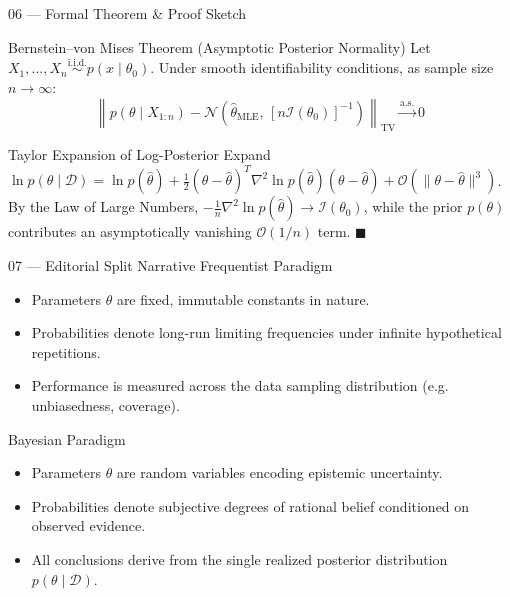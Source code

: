 \documentclass[aspectratio=169,10pt]{beamer}
\begin{document}
\begin{frame}{06 — Formal Theorem \& Proof Sketch}
  \begin{TheoremBox}{Bernstein--von Mises Theorem (Asymptotic Posterior Normality)}
    Let $X_1, \dots, X_n \overset{\text{i.i.d.}}{\sim} p(x \mid \theta_0)$. Under smooth identifiability conditions, as sample size $n \to \infty$:
    \[
      \left\| p(\theta \mid X_{1:n}) - \mathcal{N}\left(\hat{\theta}_{\mathrm{MLE}}, \, [n\mathcal{I}(\theta_0)]^{-1}\right) \right\|_{\mathrm{TV}} \xrightarrow{\mathrm{a.s.}} 0
    \]
  \end{TheoremBox}
  \vspace{.10cm}
  \begin{ProofSketch}{Taylor Expansion of Log-Posterior}
    Expand $\ln p(\theta \mid \mathcal{D}) = \ln p(\hat{\theta}) + \frac{1}{2}(\theta - \hat{\theta})^T \nabla^2 \ln p(\hat{\theta}) (\theta - \hat{\theta}) + \mathcal{O}(\|\theta - \hat{\theta}\|^3)$. By the Law of Large Numbers, $-\frac{1}{n}\nabla^2 \ln p(\hat{\theta}) \to \mathcal{I}(\theta_0)$, while the prior $p(\theta)$ contributes an asymptotically vanishing $\mathcal{O}(1/n)$ term. \hfill$\blacksquare$
  \end{ProofSketch}
\end{frame}

\begin{frame}{07 — Editorial Split Narrative}
  \SplitEditorial%
    {Frequentist Paradigm}{%
      \begin{itemize}\setlength{\itemsep}{.25em}
        \item Parameters $\theta$ are fixed, immutable constants in nature.
        \item Probabilities denote long-run limiting frequencies under infinite hypothetical repetitions.
        \item Performance is measured across the data sampling distribution (e.g. unbiasedness, coverage).
      \end{itemize}
    }%
    {Bayesian Paradigm}{%
      \begin{itemize}\setlength{\itemsep}{.25em}
        \item Parameters $\theta$ are random variables encoding epistemic uncertainty.
        \item Probabilities denote subjective degrees of rational belief conditioned on observed evidence.
        \item All conclusions derive from the single realized posterior distribution $p(\theta \mid \mathcal{D})$.
      \end{itemize}
    }
  \vfill
\end{frame}
\end{document}
